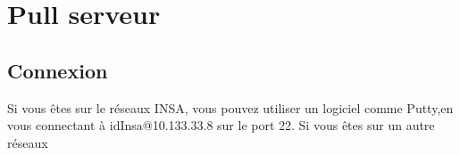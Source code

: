 \chapter{Pull serveur}
\section{Connexion}
Si vous êtes sur le réseaux INSA, vous pouvez utiliser un logiciel comme Putty,en vous connectant à idInsa@10.133.33.8 sur le port 22.
Si vous êtes sur un autre réseaux